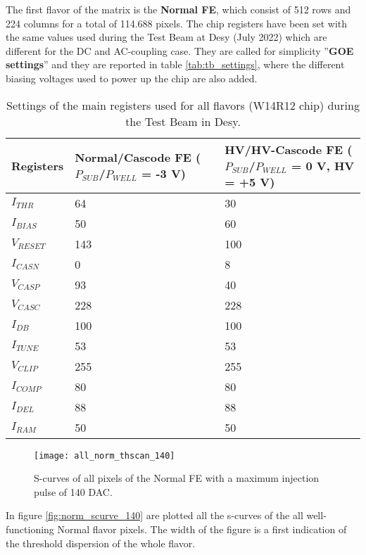 The first flavor of the matrix is the \textbf{Normal FE}, which consist of 512 rows and 224 columns for a total of 114.688 pixels. The chip registers have been set with the same values used during the Test Beam at Desy (July 2022) which are different for the DC and AC-coupling case. They are called for simplicity ''\textbf{GOE settings}'' and they are reported in table \vref{tab:tb_settings}, where the different biasing voltages used to power up the chip are also added.

\begin{table}[h!]
\centering
\begin{tabular}{>{} C{3.2cm}|C{3.7cm}|C{3.5cm}}
Registers & Normal/Cascode FE ($P_{SUB}$/$P_{WELL}$ = -3 V) & HV/HV-Cascode FE ($P_{SUB}$/$P_{WELL}$ = 0 V, HV = +5 V)\\[2ex]
\hline
$I_{THR}$ & 64 & 30\\[0.5ex]
\hline
$I_{BIAS}$ & 50 & 60\\
\hline
$V_{RESET}$ & 143 & 100\\
\hline
$I_{CASN}$ & 0 & 8\\
\hline
$V_{CASP}$ & 93 &40\\
\hline
$V_{CASC}$ & 228 & 228\\
\hline
$I_{DB}$ & 100 & 100\\
\hline
$I_{TUNE}$ & 53 & 53\\
\hline
$V_{CLIP}$ & 255 &255\\
\hline
$I_{COMP}$ & 80 & 80\\
\hline
$I_{DEL}$ & 88 & 88\\
\hline
$I_{RAM}$ & 50 & 50\\
\hline
\end{tabular}
\caption{Settings of the main registers used for all flavors (W14R12 chip) during the Test Beam in Desy.}
\label{tab:tb_settings}
\end{table}


\begin{figure}[h!]
\centering
\texttt{[image: all\_norm\_thscan\_140]}
\caption{S-curves of all pixels of the Normal FE with a maximum injection pulse of 140 DAC.}
\label{fig:norm_scurve_140}
\end{figure}

In figure \vref{fig:norm_scurve_140} are plotted all the s-curves of the all well-functioning Normal flavor pixels. The width of the figure is a first indication of the threshold dispersion of the whole flavor.\\

